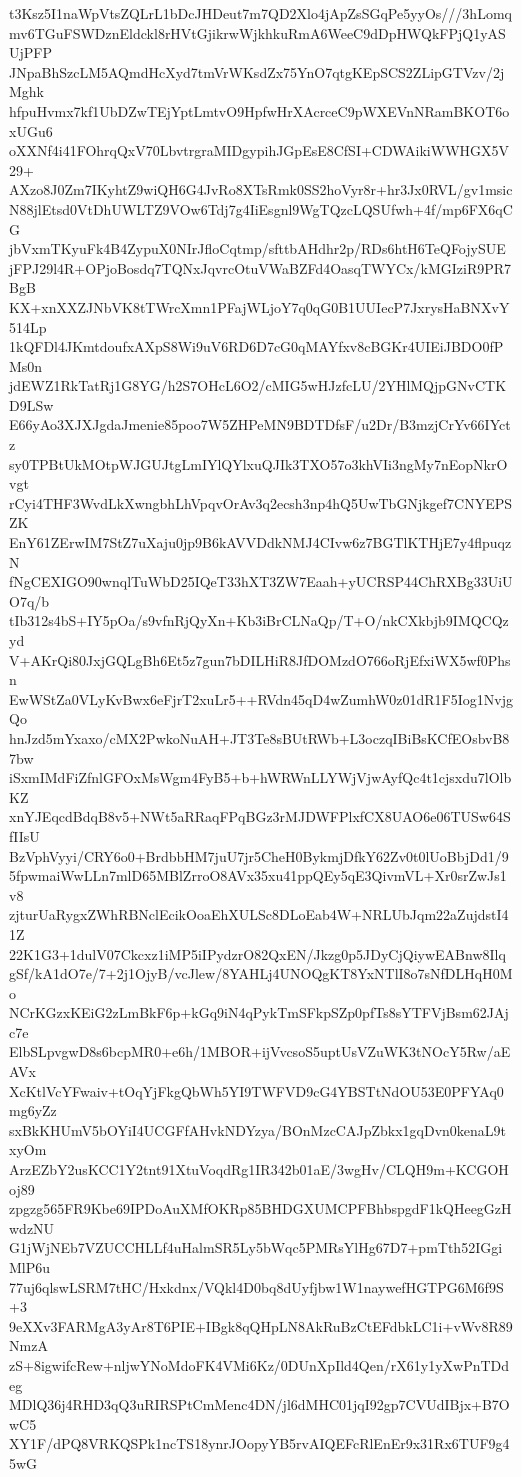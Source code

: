 t3Ksz5I1naWpVtsZQLrL1bDcJHDeut7m7QD2Xlo4jApZsSGqPe5yyOs///3hLomq
mv6TGuFSWDznEldckl8rHVtGjikrwWjkhkuRmA6WeeC9dDpHWQkFPjQ1yASUjPFP
JNpaBhSzcLM5AQmdHcXyd7tmVrWKsdZx75YnO7qtgKEpSCS2ZLipGTVzv/2jMghk
hfpuHvmx7kf1UbDZwTEjYptLmtvO9HpfwHrXAcrceC9pWXEVnNRamBKOT6oxUGu6
oXXNf4i41FOhrqQxV70LbvtrgraMIDgypihJGpEsE8CfSI+CDWAikiWWHGX5V29+
AXzo8J0Zm7IKyhtZ9wiQH6G4JvRo8XTsRmk0SS2hoVyr8r+hr3Jx0RVL/gv1msic
N88jlEtsd0VtDhUWLTZ9VOw6Tdj7g4IiEsgnl9WgTQzcLQSUfwh+4f/mp6FX6qCG
jbVxmTKyuFk4B4ZypuX0NIrJfloCqtmp/sfttbAHdhr2p/RDs6htH6TeQFojySUE
jFPJ29l4R+OPjoBosdq7TQNxJqvrcOtuVWaBZFd4OasqTWYCx/kMGIziR9PR7BgB
KX+xnXXZJNbVK8tTWrcXmn1PFajWLjoY7q0qG0B1UUIecP7JxrysHaBNXvY514Lp
1kQFDl4JKmtdoufxAXpS8Wi9uV6RD6D7cG0qMAYfxv8cBGKr4UIEiJBDO0fPMs0n
jdEWZ1RkTatRj1G8YG/h2S7OHcL6O2/cMIG5wHJzfcLU/2YHlMQjpGNvCTKD9LSw
E66yAo3XJXJgdaJmenie85poo7W5ZHPeMN9BDTDfsF/u2Dr/B3mzjCrYv66IYctz
sy0TPBtUkMOtpWJGUJtgLmIYlQYlxuQJIk3TXO57o3khVIi3ngMy7nEopNkrOvgt
rCyi4THF3WvdLkXwngbhLhVpqvOrAv3q2ecsh3np4hQ5UwTbGNjkgef7CNYEPSZK
EnY61ZErwIM7StZ7uXaju0jp9B6kAVVDdkNMJ4CIvw6z7BGTlKTHjE7y4flpuqzN
fNgCEXIGO90wnqlTuWbD25IQeT33hXT3ZW7Eaah+yUCRSP44ChRXBg33UiUO7q/b
tIb312s4bS+IY5pOa/s9vfnRjQyXn+Kb3iBrCLNaQp/T+O/nkCXkbjb9IMQCQzyd
V+AKrQi80JxjGQLgBh6Et5z7gun7bDILHiR8JfDOMzdO766oRjEfxiWX5wf0Phsn
EwWStZa0VLyKvBwx6eFjrT2xuLr5++RVdn45qD4wZumhW0z01dR1F5Iog1NvjgQo
hnJzd5mYxaxo/cMX2PwkoNuAH+JT3Te8sBUtRWb+L3oczqIBiBsKCfEOsbvB87bw
iSxmIMdFiZfnlGFOxMsWgm4FyB5+b+hWRWnLLYWjVjwAyfQc4t1cjsxdu7lOlbKZ
xnYJEqcdBdqB8v5+NWt5aRRaqFPqBGz3rMJDWFPlxfCX8UAO6e06TUSw64SfIIsU
BzVphVyyi/CRY6o0+BrdbbHM7juU7jr5CheH0BykmjDfkY62Zv0t0lUoBbjDd1/9
5fpwmaiWwLLn7mlD65MBlZrroO8AVx35xu41ppQEy5qE3QivmVL+Xr0srZwJs1v8
zjturUaRygxZWhRBNclEcikOoaEhXULSc8DLoEab4W+NRLUbJqm22aZujdstI41Z
22K1G3+1dulV07Ckcxz1iMP5iIPydzrO82QxEN/Jkzg0p5JDyCjQiywEABnw8Ilq
gSf/kA1dO7e/7+2j1OjyB/vcJlew/8YAHLj4UNOQgKT8YxNTlI8o7sNfDLHqH0Mo
NCrKGzxKEiG2zLmBkF6p+kGq9iN4qPykTmSFkpSZp0pfTs8sYTFVjBsm62JAjc7e
ElbSLpvgwD8s6bcpMR0+e6h/1MBOR+ijVvcsoS5uptUsVZuWK3tNOcY5Rw/aEAVx
XcKtlVcYFwaiv+tOqYjFkgQbWh5YI9TWFVD9cG4YBSTtNdOU53E0PFYAq0mg6yZz
sxBkKHUmV5bOYiI4UCGFfAHvkNDYzya/BOnMzcCAJpZbkx1gqDvn0kenaL9txyOm
ArzEZbY2usKCC1Y2tnt91XtuVoqdRg1IR342b01aE/3wgHv/CLQH9m+KCGOHoj89
zpgzg565FR9Kbe69IPDoAuXMfOKRp85BHDGXUMCPFBhbspgdF1kQHeegGzHwdzNU
G1jWjNEb7VZUCCHLLf4uHalmSR5Ly5bWqc5PMRsYlHg67D7+pmTth52IGgiMlP6u
77uj6qlswLSRM7tHC/Hxkdnx/VQkl4D0bq8dUyfjbw1W1naywefHGTPG6M6f9S+3
9eXXv3FARMgA3yAr8T6PIE+IBgk8qQHpLN8AkRuBzCtEFdbkLC1i+vWv8R89NmzA
zS+8igwifcRew+nljwYNoMdoFK4VMi6Kz/0DUnXpIld4Qen/rX61y1yXwPnTDdeg
MDlQ36j4RHD3qQ3uRIRSPtCmMenc4DN/jl6dMHC01jqI92gp7CVUdIBjx+B7OwC5
XY1F/dPQ8VRKQSPk1ncTS18ynrJOopyYB5rvAIQEFcRlEnEr9x31Rx6TUF9g45wG
